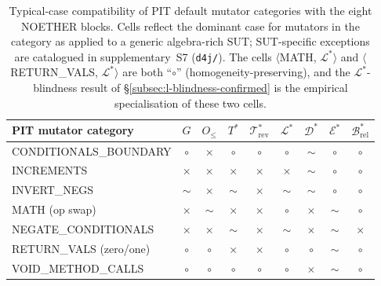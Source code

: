 \documentclass[manuscript]{acmart}
\begin{document}
\begin{table}[h]
\centering
\caption{Typical-case compatibility of PIT default mutator categories
with the eight NOETHER blocks. Cells reflect the dominant case for
mutators in the category as applied to a generic algebra-rich SUT;
SUT-specific exceptions are catalogued in
supplementary~S7 (\texttt{d4j/}). The cells $\langle$MATH, $\mathcal{L}^{*}\rangle$
and $\langle$RETURN\_VALS, $\mathcal{L}^{*}\rangle$ are both
``$\circ$'' (homogeneity-preserving), and the
$\mathcal{L}^{*}$-blindness result of \S\ref{subsec:l-blindness-confirmed}
is the empirical specialisation of these two cells.}
\label{tab:pit-block}
\small
\begin{tabular}{lcccccccc}
\toprule
PIT mutator category & $G$ & $O_{\le}$ & $T^{*}$ & $\mathcal{T}^{*}_{\mathrm{rev}}$ & $\mathcal{L}^{*}$ & $\mathcal{D}^{*}$ & $\mathcal{E}^{*}$ & $\mathcal{B}^{*}_{\mathrm{rel}}$ \\
\midrule
CONDITIONALS\_BOUNDARY & $\circ$ & $\times$ & $\circ$ & $\circ$ & $\circ$ & $\sim$ & $\circ$ & $\circ$ \\
INCREMENTS             & $\times$ & $\times$ & $\times$ & $\times$ & $\times$ & $\sim$ & $\circ$ & $\circ$ \\
INVERT\_NEGS           & $\sim$ & $\times$ & $\sim$ & $\times$ & $\sim$ & $\sim$ & $\circ$ & $\circ$ \\
MATH (op swap)         & $\times$ & $\sim$ & $\times$ & $\times$ & $\circ$ & $\times$ & $\sim$ & $\circ$ \\
NEGATE\_CONDITIONALS   & $\times$ & $\times$ & $\sim$ & $\times$ & $\sim$ & $\times$ & $\sim$ & $\times$ \\
RETURN\_VALS (zero/one) & $\circ$ & $\circ$ & $\times$ & $\times$ & $\circ$ & $\circ$ & $\sim$ & $\circ$ \\
VOID\_METHOD\_CALLS    & $\circ$ & $\circ$ & $\circ$ & $\circ$ & $\circ$ & $\times$ & $\sim$ & $\circ$ \\
\bottomrule
\end{tabular}
\end{table}
\end{document}
